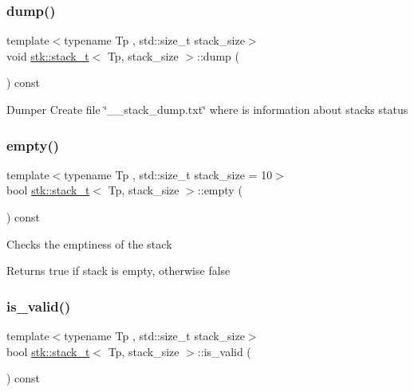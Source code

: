 \subsubsection{\texorpdfstring{dump()}{dump()}}
{\footnotesize\ttfamily template$<$typename Tp , std\+::size\+\_\+t stack\+\_\+size$>$ \\
void \hyperlink{classstk_1_1stack__t}{stk\+::stack\+\_\+t}$<$ Tp, stack\+\_\+size $>$\+::dump (\begin{DoxyParamCaption}{ }\end{DoxyParamCaption}) const\hspace{0.3cm}{\ttfamily [private]}}

Dumper Create file \char`\"{}\+\_\+\+\_\+stack\+\_\+dump.\+txt\char`\"{} where is information about stack\textquotesingle{}s status \mbox{\label{classstk_1_1stack__t_adb144d5de96aeeed6dee8d902158f1a6}} 
\subsubsection{\texorpdfstring{empty()}{empty()}}
{\footnotesize\ttfamily template$<$typename Tp , std\+::size\+\_\+t stack\+\_\+size = 10$>$ \\
bool \hyperlink{classstk_1_1stack__t}{stk\+::stack\+\_\+t}$<$ Tp, stack\+\_\+size $>$\+::empty (\begin{DoxyParamCaption}{ }\end{DoxyParamCaption}) const\hspace{0.3cm}{\ttfamily [inline]}}

Checks the emptiness of the stack \begin{DoxyReturn}{Returns}
true if stack is empty, otherwise false 
\end{DoxyReturn}
\mbox{\label{classstk_1_1stack__t_a6c1813c8dc347f0cc9ab94a6e120d743}} 
\subsubsection{\texorpdfstring{is\+\_\+valid()}{is\_valid()}}
{\footnotesize\ttfamily template$<$typename Tp , std\+::size\+\_\+t stack\+\_\+size$>$ \\
bool \hyperlink{classstk_1_1stack__t}{stk\+::stack\+\_\+t}$<$ Tp, stack\+\_\+size $>$\+::is\+\_\+valid (\begin{DoxyParamCaption}{ }\end{DoxyParamCaption}) const\hspace{0.3cm}{\ttfamily [private]}}

